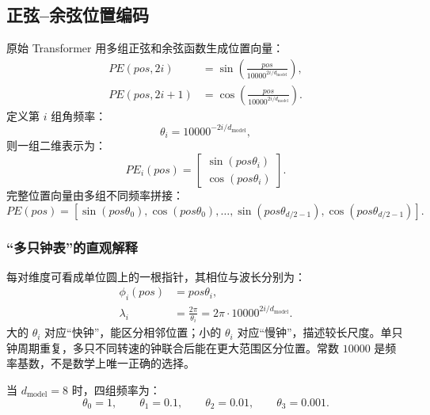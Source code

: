 \documentclass[UTF8,fontset=none,a4paper,10pt]{ctexart}
\begin{document}
\subsection{正弦--余弦位置编码}

原始 Transformer 用多组正弦和余弦函数生成位置向量\cite{zh:vaswani2017}：
\begin{align}
  PE(pos,2i)&=\sin\!\left(\frac{pos}{10000^{2i/d_{\text{model}}}}\right), \label{zh:eq:sin-pe}\\
  PE(pos,2i+1)&=\cos\!\left(\frac{pos}{10000^{2i/d_{\text{model}}}}\right). \label{zh:eq:cos-pe}
\end{align}
定义第 $i$ 组角频率：
\begin{equation}
  \theta_i=10000^{-2i/d_{\text{model}}},
  \label{zh:eq:sin-theta}
\end{equation}
则一组二维表示为：
\begin{equation}
  PE_i(pos)=
  \begin{bmatrix}
    \sin(pos\theta_i)\\
    \cos(pos\theta_i)
  \end{bmatrix}.
  \label{zh:eq:sin-pair}
\end{equation}
完整位置向量由多组不同频率拼接：
\begin{equation}
  PE(pos)=[\sin(pos\theta_0),\cos(pos\theta_0),\ldots,
  \sin(pos\theta_{d/2-1}),\cos(pos\theta_{d/2-1})].
  \label{zh:eq:sin-full}
\end{equation}

\subsubsection{“多只钟表”的直观解释}

每对维度可看成单位圆上的一根指针，其相位与波长分别为：
\begin{align}
  \phi_i(pos)&=pos\theta_i, \label{zh:eq:phase}\\
  \lambda_i&=\frac{2\pi}{\theta_i}=2\pi\cdot10000^{2i/d_{\text{model}}}. \label{zh:eq:wavelength}
\end{align}
大的 $\theta_i$ 对应“快钟”，能区分相邻位置；小的 $\theta_i$ 对应“慢钟”，描述较长尺度。单只钟周期重复，多只不同转速的钟联合后能在更大范围区分位置。常数 $10000$ 是频率基数，不是数学上唯一正确的选择。

当 $d_{\text{model}}=8$ 时，四组频率为：
\begin{equation}
  \theta_0=1,\qquad \theta_1=0.1,\qquad
  \theta_2=0.01,\qquad \theta_3=0.001.
  \label{zh:eq:d8-frequency}
\end{equation}
\end{document}
